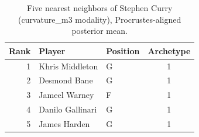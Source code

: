 \begin{table}[htbp]
  \centering\small
  \begin{tabular}{rllc}
    \toprule
    Rank & Player & Position & Archetype \\
    \midrule
    1 & Khris Middleton & G & 1 \\
    2 & Desmond Bane & G & 1 \\
    3 & Jameel Warney & F & 1 \\
    4 & Danilo Gallinari & G & 1 \\
    5 & James Harden & G & 1 \\
    \bottomrule
  \end{tabular}
  \caption{Five nearest neighbors of Stephen Curry (curvature_m3 modality), Procrustes-aligned posterior mean.}
  \label{tab:Stephen_Curry_neighbors_curvature_m3}
\end{table}

